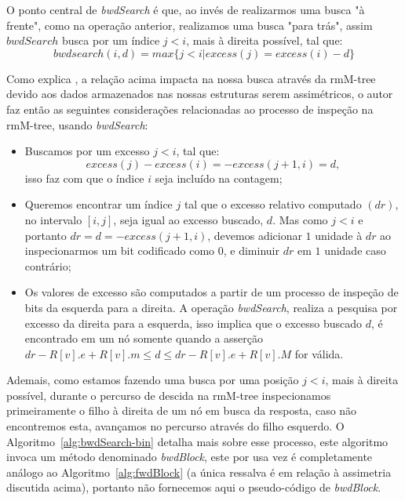     O ponto central de \textit{bwdSearch} é que, ao invés de realizarmos uma busca "à frente", como na operação anterior, realizamos uma busca "para trás", assim $bwdSearch$ busca por um índice $j < i$, mais à direita possível, tal que:
    $$bwdsearch(i,d) = max\{j < i | excess(j) = excess(i) - d\}$$

    Como explica \citet{book-compact-data-structures}, a relação acima impacta na nossa busca através da rmM-tree devido aos dados armazenados nas nossas estruturas serem assimétricos, o autor faz então as seguintes considerações relacionadas ao processo de inspeção na rmM-tree,  usando \textit{bwdSearch}:
    \begin{itemize}
        \item Buscamos por um excesso $j<i$, tal que:
         $$excess(j) - excess(i) = - excess(j+1,i) = d,$$ 
         isso faz com que o índice $i$ seja incluído na contagem;
        \item Queremos encontrar um índice $j$ tal que o excesso relativo computado $(dr)$, no intervalo $[i,j]$, seja igual ao excesso buscado, $d$. Mas como $j < i $ e portanto $dr = d = -excess(j+1,i)$, devemos adicionar $1$ unidade à $dr$ ao inspecionarmos um bit codificado como $0$, e diminuir $dr$ em $1$ unidade caso contrário;
        \item  Os valores de excesso são computados a partir de um processo de inspeção de bits da esquerda para a direita. A operação \textit{bwdSearch}, realiza a pesquisa por excesso da direita para a esquerda, isso implica que o excesso buscado $d$, é encontrado em um nó somente quando a asserção $dr - R[v].e + R[v].m \leq d \leq dr - R[v].e + R[v].M$ for válida.
    \end{itemize}
  
    Ademais, como estamos fazendo uma busca por uma posição $j<i$, mais à direita possível, durante o percurso de descida na rmM-tree inspecionamos primeiramente o filho à direita de um nó em busca da resposta, caso não encontremos esta, avançamos no percurso através do filho esquerdo. O Algoritmo~\ref*{alg:bwdSearch-bin} detalha mais sobre esse processo, este algoritmo invoca um método denominado \textit{bwdBlock}, este por usa vez é completamente análogo  ao Algoritmo~\ref{alg:fwdBlock} (a única ressalva é em relação à assimetria discutida acima), portanto não fornecemos aqui o pseudo-código de \textit{bwdBlock}.

